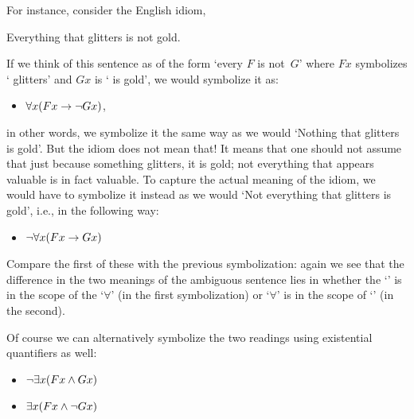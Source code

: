 			For instance, consider the English idiom,
			\begin{samplesent}
				\item\label{sent:glitters}
				Everything that glitters is not gold.
			\end{samplesent}
			If we think of this sentence as of the form `every $F$ is not~$G$' where $F{x}$ symbolizes ` glitters' and ${G}{x}$ is ` is gold', we would symbolize it as:
			\begin{itemize}
				\item $\forall x(F{x} \rightarrow \neg {G}{x})$,
			\end{itemize}
			in other words, we symbolize it the same way as we would `Nothing that glitters is gold'. But the idiom does not mean that! It means that one should not assume that just because something glitters, it is gold; not everything that appears valuable is in fact valuable.  To capture the actual meaning of the idiom, we would have to symbolize it instead as we would `Not everything that glitters is gold', i.e., in the following way:
			\begin{itemize}
				\item $\neg\forall x(F{x} \rightarrow {G}{x})$
			\end{itemize}
			Compare the first of these with the previous symbolization: again we see that the difference in the two meanings of the ambiguous sentence lies in whether the `\enot' is in the scope of the `$\forall$' (in the first symbolization) or `$\forall$' is in the scope of `\enot' (in the second).
			
			Of course we can alternatively symbolize the two readings using existential quantifiers as well:
			\begin{itemize}
				\item $\neg\exists x(F{x} \mathbin{\wedge} {G}{x})$
				\item $\exists x(F{x} \mathbin{\wedge} \neg {G}{x})$
			\end{itemize}
			
